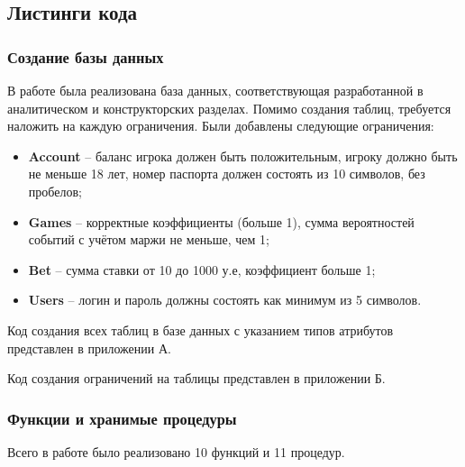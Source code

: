 \subsection{Листинги кода}

\subsubsection{Создание базы данных}
В работе была реализована база данных, соответствующая разработанной в аналитическом и конструкторских разделах.
Помимо создания таблиц, требуется наложить на каждую ограничения.
Были добавлены следующие ограничения:
\begin{itemize}
	\item \textbf{Account} -- баланс игрока должен быть положительным, игроку должно быть не меньше 18 лет, номер паспорта должен состоять из 10 символов, без пробелов;
	\item \textbf{Games} -- корректные коэффициенты (больше 1), сумма вероятностей событий с учётом маржи не меньше, чем 1;
	\item \textbf{Bet} -- сумма ставки от 10 до 1000 у.е, коэффициент больше 1;
	\item \textbf{Users} -- логин и пароль должны состоять как минимум из 5 символов.
\end{itemize} 

Код создания всех таблиц в базе данных с указанием типов атрибутов представлен в приложении А.

Код создания ограничений на таблицы представлен в приложении Б.

\subsubsection{Функции и хранимые процедуры}
Всего в работе было реализовано 10 функций и 11 процедур.

